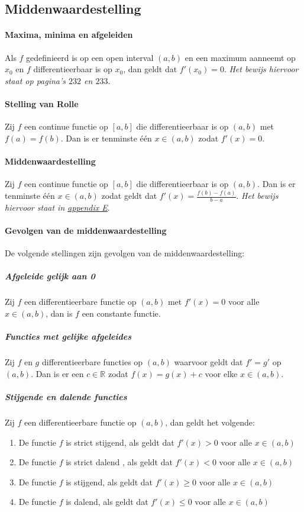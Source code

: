 \subsection{Middenwaardestelling}

\paragraph{Maxima, minima en afgeleiden} Als $f$ gedefinieerd is op een open interval $(a,b)$ en een maximum aanneemt op $x_{0}$ en $f$ differentieerbaar is op $x_{0}$, dan geldt dat $f'(x_{0})=0$. \textit{Het bewijs hiervoor staat op pagina's $232$ en $233$}.

\paragraph{Stelling van Rolle} Zij $f$ een continue functie op $[a,b]$ die differentieerbaar is op $(a,b)$ met $f(a)=f(b)$. Dan is er tenminste één $x\in(a,b)$ zodat $f'(x)=0$.

\paragraph{Middenwaardestelling} Zij $f$ een continue functie op $[a,b]$ die differentieerbaar is op $(a,b)$. Dan is er tenminste één $x\in(a,b)$ zodat geldt dat $f'(x)=\frac{f(b)-f(a)}{b-a}$. \textit{Het bewijs hiervoor staat in \hyperref[sec:AE]{appendix E}}.

\paragraph{Gevolgen van de middenwaardestelling} De volgende stellingen zijn gevolgen van de middenwaardestelling:

\subparagraph{Afgeleide gelijk aan 0} Zij $f$ een differentieerbare functie op $(a,b)$ met $f'(x)=0$ voor alle $x\in(a,b)$, dan is $f$ een constante functie.

\subparagraph{Functies met gelijke afgeleides} Zij $f$ en $g$ differentieerbare functies op $(a,b)$ waarvoor geldt dat $f'=g'$ op $(a,b)$. Dan is er een $c\in\mathbb{R}$ zodat $f(x)=g(x)+c$ voor elke $x\in(a,b)$.

\subparagraph{Stijgende en dalende functies} Zij $f$ een differentieerbare functie op $(a,b)$, dan geldt het volgende:

\begin{enumerate}
  \setlength\itemsep{0em}
  \item De functie $f$ is strict stijgend, als geldt dat $f'(x)>0$ voor alle $x\in(a,b)$
  \item De functie $f$ is strict dalend , als geldt dat $f'(x)<0$ voor alle $x\in(a,b)$
  \item De functie $f$ is stijgend, als geldt dat $f'(x)\geq0$ voor alle $x\in(a,b)$
  \item De functie $f$ is dalend, als geldt dat $f'(x)\leq0$ voor alle $x\in(a,b)$
\end{enumerate}

